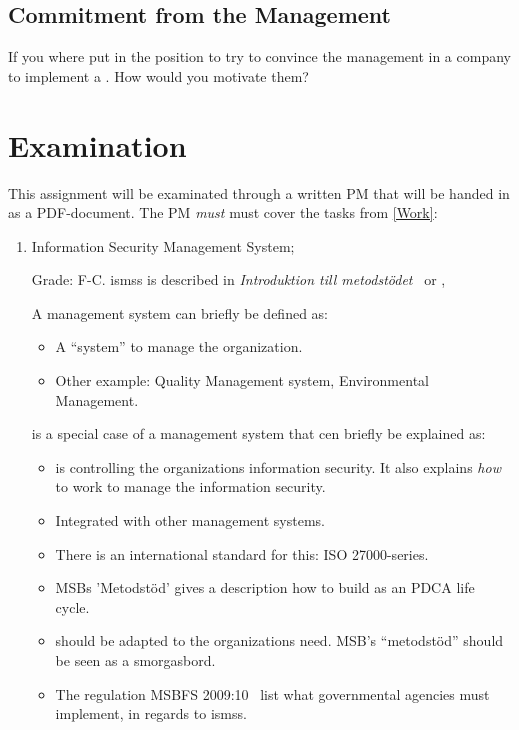 \documentclass[a4paper]{article}
\begin{document}
\subsection{Commitment from the Management}
If you where put in the position to try to convince the management in a company
to implement a . How would you motivate them?

\section{Examination}
\label{sec:examination}

This assignment will be examinated through a written PM that will be handed in
as a PDF-document.
The PM \emph{must} must cover the tasks from \cref{Work}:

\begin{enumerate}
  \item Information Security Management System;
    \begin{solution}
      Grade: F-C.
      \acp{isms} is described in \emph{Introduktion till 
        metodstödet}~\cite{MSB2011itm} or \cite[chap. 3]{iso27000},

      A management system can briefly be defined as:
      \begin{itemize}
        \item A \enquote{system} to manage the organization.
        \item Other example: Quality Management system, Environmental Management.
      \end{itemize}

       is a special case of a management system that cen briefly be
      explained as:
      \begin{itemize}
        \item {} is controlling the organizations information
          security. It also explains \emph{how} to work to manage the
          information security.

        \item Integrated with other management systems.
        \item There is an international standard for this: ISO 27000-series.
        \item MSBs 'Metodstöd' gives a description how to build  as
          an PDCA life cycle.
        \item {} should be adapted to the organizations need. MSB's
          \enquote{metodstöd} should be seen as a smorgasbord.
        \item The regulation MSBFS 2009:10~\cite{MSBFS2009:10} list what
          governmental agencies must implement, in regards to \acp{isms}.
      \end{itemize}
    \end{solution}


\end{enumerate}
\end{document}
